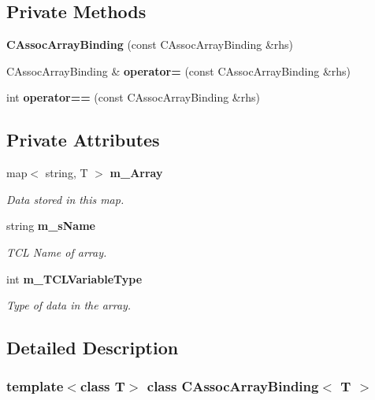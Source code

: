 \subsection*{Private Methods}
\begin{CompactItemize}
\item 
{\bf CAssoc\-Array\-Binding} (const CAssoc\-Array\-Binding \&rhs)
\item 
CAssoc\-Array\-Binding \& {\bf operator=} (const CAssoc\-Array\-Binding \&rhs)
\item 
int {\bf operator==} (const CAssoc\-Array\-Binding \&rhs)
\end{CompactItemize}
\subsection*{Private Attributes}
\begin{CompactItemize}
\item 
map$<$ string, T $>$ {\bf m\_\-Array}
\begin{CompactList}\small\item\em Data stored in this map.\item\end{CompactList}\item 
string {\bf m\_\-s\-Name}
\begin{CompactList}\small\item\em TCL Name of array.\item\end{CompactList}\item 
int {\bf m\_\-TCLVariable\-Type}
\begin{CompactList}\small\item\em Type of data in the array.\item\end{CompactList}\end{CompactItemize}


\subsection{Detailed Description}
\subsubsection*{template$<$class T$>$ class CAssoc\-Array\-Binding$<$ T $>$}

